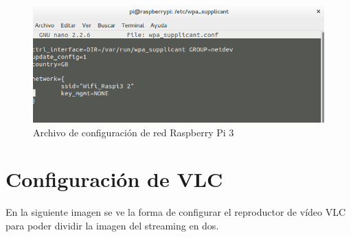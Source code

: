 \documentclass[twoside, 11pt]{epstfg}
\begin{document}
\begin{figure}[H]
	\centerline{
		\mbox{\includegraphics[width=.95\textwidth]{images/confRaspiWifi.png}}
	}
	\caption{Archivo de configuración de red Raspberry Pi 3}
	\label{confwpa}
\end{figure}

\chapter{Configuración de VLC}
\vspace*{-4cm}

En la siguiente imagen se ve la forma de configurar el reproductor de vídeo VLC para poder dividir la imagen del streaming en dos.
\end{document}
